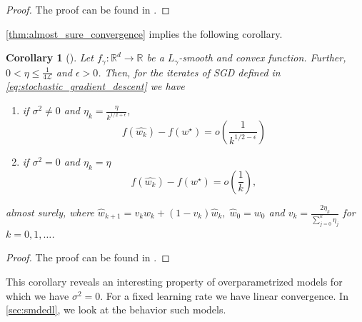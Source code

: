 \documentclass[12pt]{article}
\newtheorem{corollary}[theorem]{Corollary}
\theoremstyle{definition}
\newtheorem{assumption}[assumption]{Assumption}
\numberwithin{equation}{section}
\newcommand{\R}{\mathbb{R}}
\newcommand{\CL}{\mathcal{L}}
\begin{document}
\begin{proof}
  The proof can be found in \autocite{sebbouhAlmostSureConvergence2021}.
\end{proof}
\autoref{thm:almost_sure_convergence} implies the following corollary.
\begin{corollary}[]
  \label{cor:sgd_convergence}
  Let $f_{\gamma}: \R^d \rightarrow \R$ be a $L_\gamma$-smooth and convex function. Further, $0 < \eta \leq \frac{1}{4\CL}$ and $\epsilon > 0 $. Then, for the iterates of SGD defined in \eqref{eq:stochastic_gradient_descent} we have 
  \begin{enumerate}[label=(\roman*)]
    \item if $\sigma^2 \neq 0$ and $\eta_k = \frac{\eta}{k^{1/2+\epsilon}}$,
    \begin{equation*}
      f(\widehat{w_{k}}) - f(w^\star) = o\left(\frac{1}{k^{1/2-\epsilon}}\right)
    \end{equation*}
    \item if $\sigma^2 = 0$ and $\eta_k = \eta$
    \begin{equation*}
      f(\widehat{w_{k}}) - f(w^\star) = o\left(\frac{1}{k}\right),
    \end{equation*}
  \end{enumerate}
  almost surely, where $\widehat{w}_{k+1} = v_k w_k + (1-v_k)\widehat{w}_k, \; \widehat{w}_0 = w_0$ and $v_k = \frac{2\eta_k}{\sum_{j=0}^k\eta_j}$ for $k=0,1,\dots$.
\end{corollary}
\begin{proof}
  The proof can be found in \cite{sebbouhAlmostSureConvergence2021}.
\end{proof}
  This corollary reveals an interesting property of overparametrized models for which we have $\sigma^2 = 0$. For a fixed learning rate we have linear convergence. In \autoref{sec:smdedl}, we look at the behavior such models.
\end{document}
